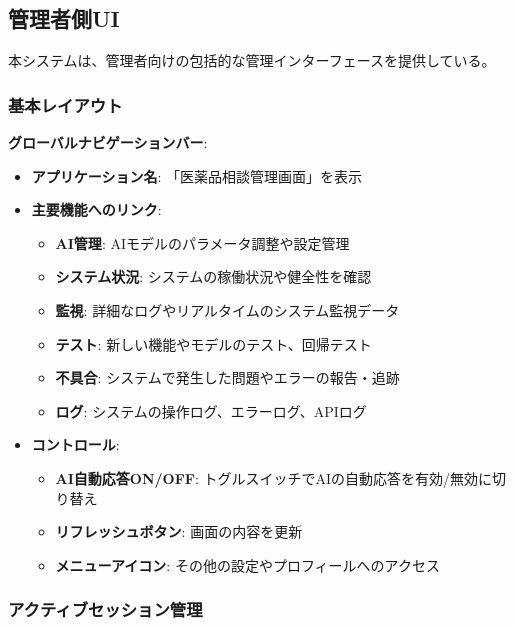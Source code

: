 \documentclass[a4paper,11pt,ja=standard,xelatex]{bxjsarticle}
\theoremstyle{definition}
\begin{document}
\subsection{管理者側UI}

本システムは、管理者向けの包括的な管理インターフェースを提供している。

\subsubsection{基本レイアウト}

\textbf{グローバルナビゲーションバー}:
\begin{itemize}
\item \textbf{アプリケーション名}: 「医薬品相談管理画面」を表示
\item \textbf{主要機能へのリンク}: 
  \begin{itemize}
  \item \textbf{AI管理}: AIモデルのパラメータ調整や設定管理
  \item \textbf{システム状況}: システムの稼働状況や健全性を確認
  \item \textbf{監視}: 詳細なログやリアルタイムのシステム監視データ
  \item \textbf{テスト}: 新しい機能やモデルのテスト、回帰テスト
  \item \textbf{不具合}: システムで発生した問題やエラーの報告・追跡
  \item \textbf{ログ}: システムの操作ログ、エラーログ、APIログ
  \end{itemize}
\item \textbf{コントロール}: 
  \begin{itemize}
  \item \textbf{AI自動応答ON/OFF}: トグルスイッチでAIの自動応答を有効/無効に切り替え
  \item \textbf{リフレッシュボタン}: 画面の内容を更新
  \item \textbf{メニューアイコン}: その他の設定やプロフィールへのアクセス
  \end{itemize}
\end{itemize}

\subsubsection{アクティブセッション管理}
\end{document}
